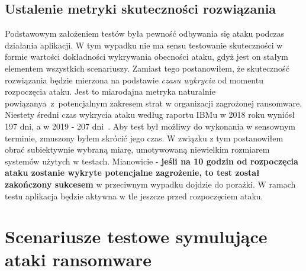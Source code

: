\subsection{Ustalenie metryki skuteczności rozwiązania}
Podstawowym założeniem testów była pewność odbywania się ataku podczas działania aplikacji. W tym wypadku nie ma sensu testowanie skuteczności w formie wartości dokładności wykrywania obecności ataku, gdyż jest on stałym elementem wszystkich scenariuszy. Zamiast tego postanowiłem, że skuteczność rozwiązania będzie mierzona na podstawie \emph{czasu wykrycia} od momentu rozpoczęcia ataku. Jest to miarodajna metryka naturalnie powiązanya~z~potencjalnym zakresem strat w organizacji zagrożonej ransomware.
\newline
Niestety średni czas wykrycia ataku według raportu IBMu w 2018 roku wyniósł 197 dni, a w 2019 - 207 dni~\cite{security_2019_nodate}. Aby test był możliwy do wykonania w sensownym terminie, zmuszony byłem skrócić jego czas. W związku z tym postanowiłem obrać subiektywnie wybraną miarę, umotywowaną niewielkim rozmiarem systemów użytych w testach. Mianowicie - \textbf{jeśli na 10 godzin od rozpoczęcia ataku zostanie wykryte potencjalne zagrożenie, to test został zakończony sukcesem} w przeciwnym wypadku dojdzie do porażki. W ramach testu aplikacja będzie aktywna w tle jeszcze przed rozpoczęciem ataku.
\section{Scenariusze testowe symulujące ataki ransomware}
